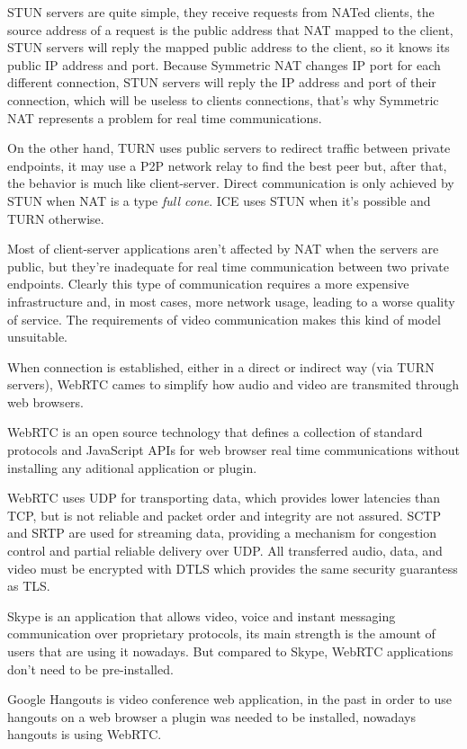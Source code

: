 \ac{STUN} servers are quite simple, they receive requests from \ac{NAT}ed clients, the source address of a request is the public address that \ac{NAT} mapped to the client, \ac{STUN} servers will reply the mapped public address to the client, so it knows its public \ac{IP} address and port. Because Symmetric \ac{NAT} changes \ac{IP} port for each different connection, \ac{STUN} servers will reply the \ac{IP} address and port of their connection, which will be useless to clients connections, that's why Symmetric \ac{NAT} represents a problem for real time communications.   

On the other hand, \ac{TURN} uses public servers to redirect traffic between private endpoints, it may use a \ac{P2P} network relay to find the best peer but, after that, the behavior is much like client-server. Direct communication is only achieved by \ac{STUN} when \ac{NAT} is a type \textit{full cone}. \ac{ICE} uses \ac{STUN} when it's possible and \ac{TURN} otherwise.

Most of client-server applications aren't affected by \ac{NAT} when the servers are public, but they're inadequate for real time communication between two private endpoints. Clearly this type of communication requires a more expensive infrastructure and, in most cases, more network usage, leading to a worse quality of service. The requirements of video communication makes this kind of model unsuitable.

When connection is established, either in a direct or indirect way (via \ac{TURN} servers), \ac{WebRTC} cames to simplify how audio and video are transmited through web browsers.

\ac{WebRTC} is an open source technology that defines a collection of standard protocols and JavaScript \ac{API}s for web browser real time communications without installing any aditional application or plugin.

\ac{WebRTC} uses \ac{UDP} for transporting data, which provides lower latencies than \ac{TCP}, but is not reliable and packet order and integrity are not assured. \ac{SCTP} and \ac{SRTP} are used for streaming data, providing a mechanism for congestion control and partial reliable delivery over \ac{UDP}. All transferred audio, data,  and video must be encrypted with \ac{DTLS} which provides the same security guarantess as \ac{TLS}. 

Skype is an application that allows video, voice and instant messaging communication over proprietary protocols, its main strength is the amount of users that are using it nowadays. But compared to Skype, \ac{WebRTC} applications don't need to be pre-installed.

Google Hangouts is video conference web application, in the past in order to use hangouts on a web browser a plugin was needed to be installed, nowadays hangouts is using \ac{WebRTC}.
